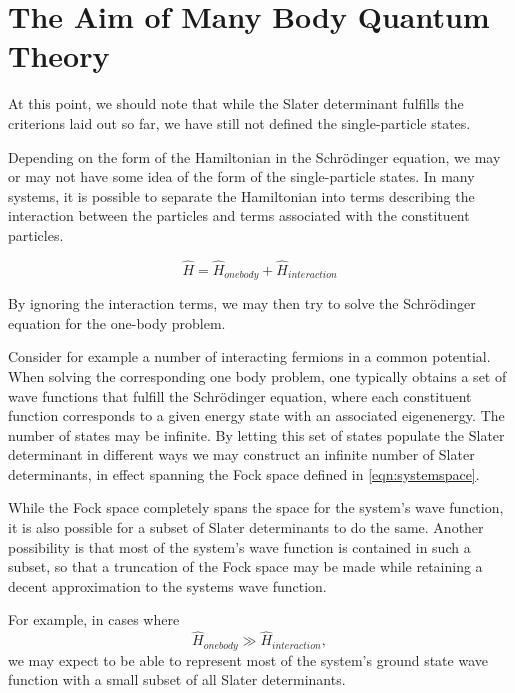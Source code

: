 
\section{The Aim of Many Body Quantum Theory}

At this point, we should note that while the Slater determinant fulfills the
criterions laid out so far, we have still not defined the single-particle
states. 

Depending on the form of the Hamiltonian in the Schrödinger equation,
we may or may not have some idea of the form of the single-particle states. In many
systems, it is possible to separate the Hamiltonian into terms
describing the interaction between the particles and terms associated
with the constituent particles.

\begin{equation}
 \hat{H} = \hat{H}_{onebody} + \hat{H}_{interaction}
\label{eqn:sephamilt}
\end{equation}

By ignoring the interaction terms, we may then try to solve the Schrödinger equation for the one-body problem.

Consider for example a number of interacting fermions in a common
potential. When solving the corresponding one body problem, one
typically obtains a set of wave functions that fulfill the Schrödinger
equation, where each constituent function corresponds to a given energy
state with an associated eigenenergy. The number of states may be infinite. By letting this set of
states populate the Slater determinant in different ways 
we may construct an infinite number of Slater determinants, in
effect spanning the Fock space defined in \ref{eqn:systemspace}.

While the Fock space completely spans the space for the system's wave
function, it is also possible for a subset of Slater determinants to do the
same. Another possibility is that most of the system's wave function
is contained in such a subset, so that a truncation of the Fock space
may be made while retaining a decent approximation to the systems wave
function.

For example, in cases where
\begin{equation}
 \hat{H}_{onebody} \gg \hat{H}_{interaction},
\label{eqn:lesserinteraction}
\end{equation}
we may expect to be able to represent most of the system's ground state
wave function with a small subset of all Slater determinants. 


